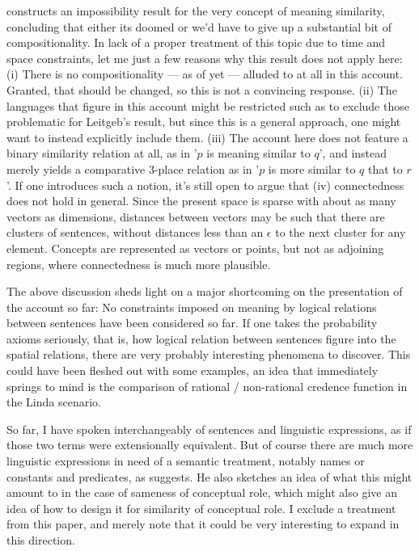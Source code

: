 \documentclass[11pt, a4paper]{scrartcl}
\begin{document}
\textcite{Leitgeb2008-LEIAIR} constructs an impossibility result for the very concept of meaning similarity, concluding that either its doomed or we'd have to give up a substantial bit of compositionality. In lack of a proper treatment of this topic due to time and space constraints, let me just a few reasons why this result does not apply here: (i) There is no compositionality --- as of yet --- alluded to at all in this account. Granted, that should be changed, so this is not a convincing response. (ii) The languages that figure in this account might be restricted such as to exclude those problematic for Leitgeb's result, but since this is a general approach, one might want to instead explicitly include them. (iii) The account here does not feature a binary similarity relation at all, as in '$p$ is meaning similar to $q$', and instead merely yields a comparative 3-place relation as in '$p$ is more similar to $q$ that to $r$'. If one introduces such a notion, it's still open to argue that (iv) connectedness does not hold in general. Since the present space is sparse with about as many vectors as dimensions, distances between vectors may be such that there are clusters of sentences, without distances less than an $\epsilon$ to the next cluster for any element. Concepts are represented as vectors or points, but not as adjoining regions, where connectedness is much more plausible. 

The above discussion sheds light on a major shortcoming on the presentation of the account so far: No constraints imposed on meaning by logical relations between sentences have been considered so far. If one takes the probability axioms seriously, that is, how logical relation between sentences figure into the spatial relations, there are very probably interesting phenomena to discover. This could have been fleshed out with some examples, an idea that immediately springs to mind is the comparison of rational / non-rational credence function in the Linda scenario.

So far, I have spoken interchangeably of sentences and linguistic expressions, as if those two terms were extensionally equivalent. But of course there are much more linguistic expressions in need of a semantic treatment, notably names or constants and predicates, as \textcite[396]{Field1977} suggests. He also sketches an idea of what this might amount to in the case of sameness of conceptual role, which might also give an idea of how to design it for similarity of conceptual role. I exclude a treatment from this paper, and merely note that it could be very interesting to expand in this direction.
\end{document}
